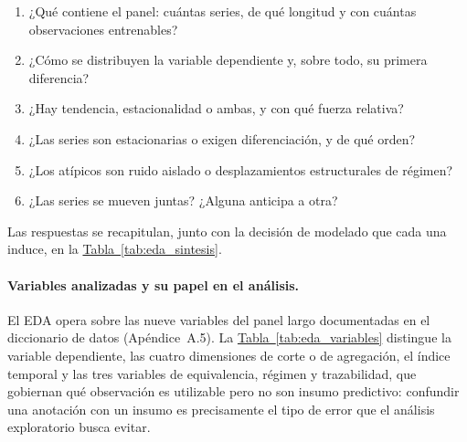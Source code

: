 \documentclass[12pt,letterpaper]{report}
\begin{document}
\begin{enumerate}[leftmargin=*, itemsep=0pt, topsep=2pt]
\item ¿Qué contiene el panel: cuántas series, de qué longitud y con cuántas observaciones entrenables?
\item ¿Cómo se distribuyen la variable dependiente y, sobre todo, su primera diferencia?
\item ¿Hay tendencia, estacionalidad o ambas, y con qué fuerza relativa?
\item ¿Las series son estacionarias o exigen diferenciación, y de qué orden?
\item ¿Los atípicos son ruido aislado o desplazamientos estructurales de régimen?
\item ¿Las series se mueven juntas? ¿Alguna anticipa a otra?
\end{enumerate}

Las respuestas se recapitulan, junto con la decisión de modelado que cada una induce, en la
\hyperref[tab:eda_sintesis]{Tabla~\ref*{tab:eda_sintesis}}.

\paragraph{Variables analizadas y su papel en el análisis.} El EDA opera sobre las nueve
variables del panel largo documentadas en el diccionario de datos (Apéndice~A.5). La
\hyperref[tab:eda_variables]{Tabla~\ref*{tab:eda_variables}} distingue la variable dependiente, las cuatro dimensiones de corte o
de agregación, el índice temporal y las tres variables de equivalencia, régimen y trazabilidad,
que gobiernan qué observación es utilizable pero no son insumo predictivo: confundir una
anotación con un insumo es precisamente el tipo de error que el análisis exploratorio busca evitar.
\end{document}
